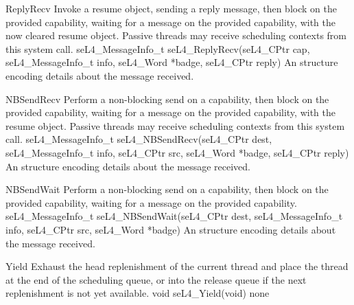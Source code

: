 {ReplyRecv}
{Invoke a resume object, sending a reply message, then block on the provided capability, waiting for
a message on the provided capability, with the now cleared resume object. Passive threads may receive
scheduling contexts from  this system call.}
{seL4_MessageInfo_t seL4_ReplyRecv(seL4_CPtr cap, seL4_MessageInfo_t info, seL4_Word *badge,
seL4_CPtr reply)}
{
}
{An  structure encoding details about the message received.}

{NBSendRecv}
{Perform a non-blocking send on a capability, then block on the provided capability, waiting for
a message on the provided capability, with the resume object. Passive threads may receive
scheduling contexts from this system call.}
{seL4_MessageInfo_t seL4_NBSendRecv(seL4_CPtr dest, seL4_MessageInfo_t info, seL4_CPtr src,
    seL4_Word *badge, seL4_CPtr reply)}
{
}
{An  structure encoding details about the message received.}

{NBSendWait}
{Perform a non-blocking send on a capability, then block on the provided capability, waiting for
a message on the provided capability.}
{seL4_MessageInfo_t seL4_NBSendWait(seL4_CPtr dest, seL4_MessageInfo_t info, seL4_CPtr src,
    seL4_Word *badge)}
{
}
{An  structure encoding details about the message received.}

{Yield}
{Exhaust the head replenishment of the current thread and place the thread at the end of the
scheduling queue, or into the release queue if the next replenishment is not yet available.}
{void seL4_Yield(void)}
{}
{none}



